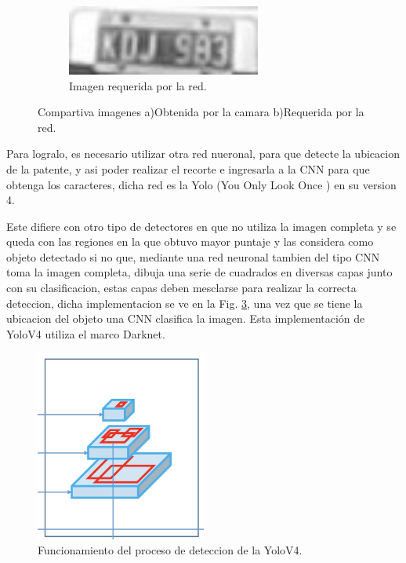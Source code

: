 \begin{figure}[!tbp]
\begin{subfigure}[b]{0.49\textwidth}
        \includegraphics[width=0.7\textwidth, height=0.7\textwidth]{imgs/imagen-requerida.jpg}
        \caption{Imagen requerida por la red.}
        \label{fig:imagen-requerida}
    \end{subfigure}
    \caption{Compartiva imagenes a)Obtenida por la camara b)Requerida por la red.}
    \label{fig:Comparativa-imagenes}
\end{figure}

Para logralo, es necesario utilizar otra red nueronal, para que detecte la ubicacion de la patente, y asi poder realizar el recorte e ingresarla
a la CNN para que obtenga los caracteres, dicha red es la Yolo (You Only Look Once ) en su version 4.

Este difiere con otro tipo de detectores en que no utiliza la imagen completa y se queda con las regiones en la que obtuvo mayor puntaje y las
considera como objeto detectado si no que, mediante una red neuronal tambien del tipo CNN toma la imagen completa, dibuja una serie de cuadrados
en diversas capas junto con su clasificacion, estas capas deben mesclarse para realizar la correcta deteccion, dicha implementacion se ve en la
Fig. \ref{fig:funcionamiento-yolo}, una vez que se tiene la ubicacion del objeto una CNN clasifica la imagen. Esta implementación de YoloV4
utiliza el marco Darknet.
\begin{figure}
    \centering
    \includegraphics[width=0.5\textwidth]{imgs/funcionamiento-yolo.png}
    \caption{Funcionamiento del proceso de deteccion de la YoloV4.}
    \label{fig:funcionamiento-yolo}
\end{figure}

